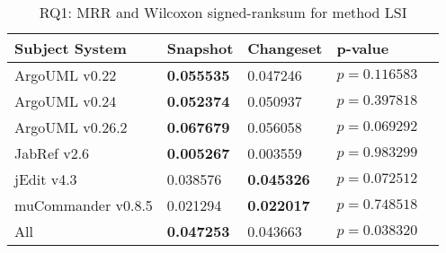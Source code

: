 
\begin{table}[t]
\renewcommand{\arraystretch}{1.3}
\footnotesize
\centering
\caption{RQ1: MRR and Wilcoxon signed-ranksum for method LSI}
\begin{tabular}{l|ll|ll}
   \toprule
    Subject System & Snapshot & Changeset & p-value  \\
    \midrule

ArgoUML v0.22 & {\bf 0.055535 } & 0.047246 & $p = 0.116583$ \\
ArgoUML v0.24 & {\bf 0.052374 } & 0.050937 & $p = 0.397818$ \\
ArgoUML v0.26.2 & {\bf 0.067679 } & 0.056058 & $p = 0.069292$ \\
JabRef v2.6 & {\bf 0.005267 } & 0.003559 & $p = 0.983299$ \\
jEdit v4.3 & 0.038576 & {\bf 0.045326 } & $p = 0.072512$ \\
muCommander v0.8.5 & 0.021294 & {\bf 0.022017 } & $p = 0.748518$ \\
\midrule
All & {\bf 0.047253 } & 0.043663 & $p = 0.038320$ \\

    \bottomrule
\end{tabular}
\label{table:rq1:method:lsi}
\end{table}

